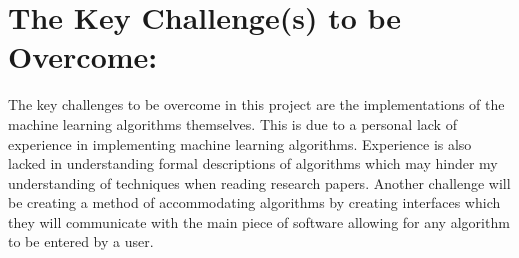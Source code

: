 \section*{The Key Challenge(s) to be Overcome:}
\noindent The key challenges to be overcome in this project are the implementations of the machine learning algorithms themselves. This is due to a personal lack of experience in implementing machine learning algorithms. Experience is also lacked in understanding formal descriptions of algorithms which may hinder my understanding of techniques when reading research papers. Another challenge will be creating a method of accommodating algorithms by creating interfaces which they will communicate with the main piece of software allowing for any algorithm to be entered by a user.
